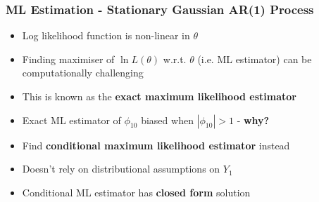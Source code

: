 \documentclass{beamer}
\begin{document}
	\begin{frame}
		\frametitle{ML Estimation - Stationary Gaussian AR(1) Process}
		\begin{itemize}
			
			\item[] Log likelihood function is non-linear in $\theta$ 
					\pause	\vspace{25pt} 
			\item[] Finding maximiser of $\ln L(\theta)$ w.r.t. $\theta$ (i.e. ML estimator) can be computationally challenging 
					\pause	\vspace{25pt} 
			\item[] This is known as the \textbf{exact maximum likelihood estimator }
					\pause	\vspace{10pt} 
			\item[] \hspace{35pt} Exact ML estimator of $\phi_{10}$ biased when $|\phi_{10}|>1$  - \textbf{why?}
					\pause	\vspace{25pt} 
			\item[] Find \textbf{conditional maximum likelihood estimator} instead
								\pause	\vspace{10pt} 
			\item[]\hspace{35pt} Doesn't rely on distributional assumptions on $Y_1$ 
				\pause	\vspace{10pt} 
			\item[]\hspace{35pt} Conditional ML estimator has \textbf{closed form} solution  
		\end{itemize}
	\end{frame}
\end{document}
